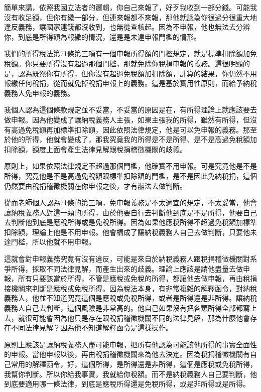 \documentclass[oneside,sub3section]{ctexbook}
\begin{document}
簡單來講，依照我國立法者的邏輯，你自己來報了，好歹我收到一部分錢。可能我沒有收足額，但你有繳一部分，但連來報都不來報，那他就認為你很過分很重大地違反義務，讓國家連錢都沒收到，也無從查核起。因為不申報，他也無法去分辨你，到底是所得額為報繳的情況，還是是未達申報門檻的情形。

我們的所得稅法第71條第三項有一個申報所得額的門檻規定，就是標準扣除額加免稅額。你只要所得沒有超過那個門檻，那就免除你稅捐申報的義務。這很明顯的是，認為既然你有所得，但你沒有超過免稅額加扣除額，計算的結果，你仍然不用報繳任何稅捐，從而就免掉稅捐申報上的義務。這是基於實用性原則，而給予納稅義務人免申報的義務。

我個人認為這個條款規定並不妥當，不妥當的原因是在，有所得理論上就應該要去做申報。因為他變成了讓納稅義務人主張，如果主張我的所得，雖然有所得，但沒有高過免稅額再加標準扣除額，因此依照法律規定，他是可以免申報的義務。那至於他的所得，他就會變成了，那我究竟我的所得是不是所得、是不是高過免稅額加扣除額，額度上面會產生法律見解跟稅捐稽徵機關的歧義。

原則上，如果依照法律規定不超過那個門檻，他確實不用申報。可是究竟他是不是所得，究竟他是不是高過免稅額跟標準扣除額的門檻，是不是因此免納稅捐，這個仍然要由稅捐稽徵機關在你申報之後，才有辦法去做判斷。

從而老師個人認為71條的第三項，免申報義務是不太適宜的規定，不太妥當，他會讓納稅義務人對這一類的所得，由於他要自行去判斷他到底是不是所得，他要自己去判斷他到底是應稅所得或是免稅所得。因為如果他應稅所得不超過免稅額加標準扣除額，理論上他是不用申報。他會構成了讓納稅義務人自己去做判斷，只要他未達門檻，所以他就不用申報。

這就會對申報義務究竟有沒有違反，可能是來自於納稅義務人跟稅捐稽徵機關對系爭所得，採取不同法律見解，而產生出來的歧義。理論上應該是請他盡量去做申報，所有只要該當於所得，不管是應稅或免稅的所得，都讓他去做申報，再由稅捐接機關來判斷是應稅或免稅所得。因為稅法本身，有非常複雜的解釋函令，對納稅義務人，他並不知道究竟這個是應稅或免稅所得，或者是所得還是非所得。讓納稅義務人自己去判斷，這個風險是非常高的。他自己如果沒有把各類所得全部都寫上去，就很可能會因為他只是存在跟稅捐稽徵機關不同的法律見解，那為什麼他會存在不同法律見解？因為他不知道解釋函令是這樣操作。

原則上應該是讓納稅義務人盡可能申報，把所有他認為可能該他所得的事實全面性的申報。當他申報以後，再由稅捐稽徵機關來為他去決定。因為稅捐稽徵機關有自己常用的解釋函令，好，這個所得，是所得還是非所得，這個是應稅或免稅所得，我幫你判斷。所以你給我事實，我就給你稅額。而不是納稅義務人自己要判斷，他到底要適用哪一條法律，到底是應稅所得還是免稅所得，或是非所得或是所得。
\end{document}
